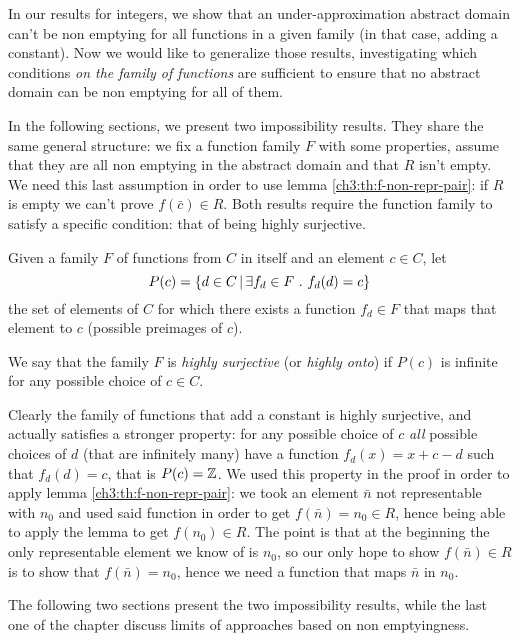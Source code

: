In our results for integers, we show that an under-approximation abstract domain can't be non emptying for all functions in a given family (in that case, adding a constant). Now we would like to generalize those results, investigating which conditions \textit{on the family of functions} are sufficient to ensure that no abstract domain can be non emptying for all of them.

In the following sections, we present two impossibility results. They share the same general structure: we fix a function family $F$ with some properties, assume that they are all non emptying in the abstract domain and that $R$ isn't empty. We need this last assumption in order to use lemma \ref{ch3:th:f-non-repr-pair}: if $R$ is empty we can't prove $f(\bar{c}) \in R$.
Both results require the function family to satisfy a specific condition: that of being highly surjective.

\begin{definition}\label{ch4:def:highly-onto-func-family}
	Given a family $F$ of functions from $C$ in itself and an element $c \in C$, let
	\[
	P(c) = \{ d \in C \,\vert\, \exists f_d \in F\ .\ f_d(d) = c \}
	\]
	the set of elements of $C$ for which there exists a function $f_d \in F$ that maps that element to $c$ (possible preimages of $c$).

	We say that the family $F$ is \textit{highly surjective} (or \textit{highly onto}) if $P(c)$ is infinite for any possible choice of $c \in C$.
\end{definition}

Clearly the family of functions that add a constant is highly surjective, and actually satisfies a stronger property: for any possible choice of $c$ \textit{all} possible choices of $d$ (that are infinitely many) have a function $f_d(x) = x + c - d$ such that $f_d(d) = c$, that is $P(c) = \mathbb{Z}$. We used this property in the proof in order to apply lemma \ref{ch3:th:f-non-repr-pair}: we took an element $\bar{n}$ not representable with $n_0$ and used said function in order to get $f(\bar{n}) = n_0 \in R$, hence being able to apply the lemma to get $f(n_0) \in R$. The point is that at the beginning the only representable element we know of is $n_0$, so our only hope to show $f(\bar{n}) \in R$ is to show that $f(\bar{n}) = n_0$, hence we need a function that maps $\bar{n}$ in $n_0$.

The following two sections present the two impossibility results, while the last one of the chapter discuss limits of approaches based on non emptyingness.

